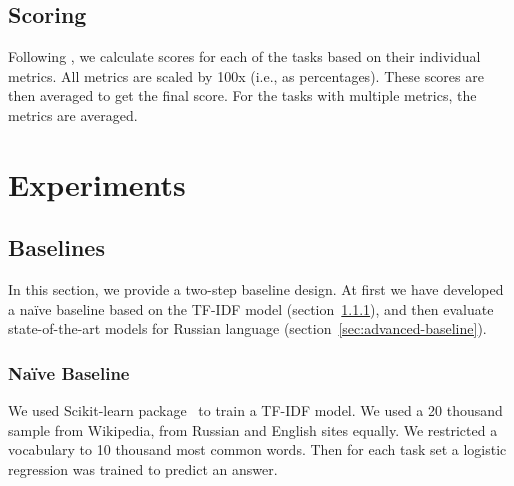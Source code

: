 \documentclass[11pt,a4paper]{article}
\begin{document}
 

\subsection{Scoring}
Following \cite{wang2019superglue}, we calculate scores for each of the tasks based on their individual metrics. All metrics are scaled by 100x (i.e., as percentages). These scores are then averaged to get the final score. For the tasks with multiple metrics, the metrics are averaged.

\section{Experiments} \label{sec:experiments}

\subsection{Baselines}In this section, we provide a two-step baseline design. At first we have developed a naïve baseline based on the TF-IDF model (section~\ref{sec:simple-baseline}), and then evaluate state-of-the-art models for Russian language (section~\ref{sec:advanced-baseline}).  

\subsubsection{Naïve Baseline}\label{sec:simple-baseline}
We used Scikit-learn package~\cite{pedregosa2011scikit} to train a TF-IDF model. We used a 20 thousand sample from Wikipedia, from Russian and English sites equally. We restricted a vocabulary to 10 thousand most common words.
Then for each task set a logistic regression was trained to predict an answer. 
\end{document}
